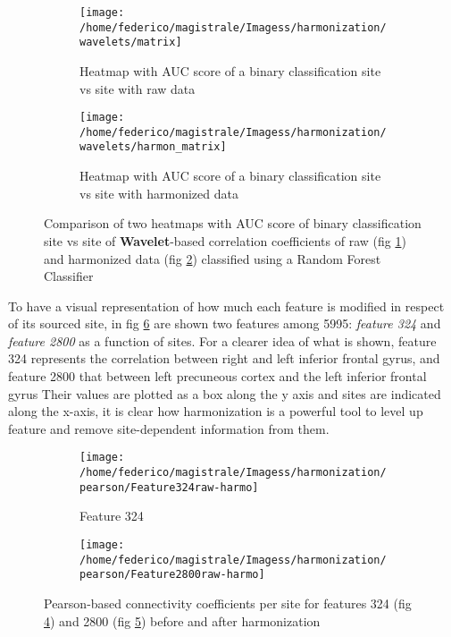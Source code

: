 \documentclass[10pt]{report}
\begin{document}
\begin{figure}
\centering
\begin{subfigure}[b]{0.70\textwidth}
   \texttt{[image: /home/federico/magistrale/Imagess/harmonization/wavelets/matrix]}
   \caption{Heatmap with AUC score of a binary classification site vs site with raw data}
   \label{fig:heatmap_harmonization_harmon_w}
\end{subfigure}

\begin{subfigure}[b]{0.70\textwidth}
   \texttt{[image: /home/federico/magistrale/Imagess/harmonization/wavelets/harmon\_matrix]}
   \caption{Heatmap with AUC score of a binary classification site vs site with harmonized data}
   \label{fig:heatmap_harmonization_noharmon_w}
\end{subfigure}

\caption{Comparison of two heatmaps with AUC score of binary classification site vs site of \textbf{Wavelet}-based correlation coefficients of raw (fig \ref{fig:heatmap_harmonization_harmon_w}) and harmonized data (fig \ref{fig:heatmap_harmonization_noharmon_w}) classified using a Random Forest Classifier
}
\label{fig:heatmap_harmonization_w}
\end{figure}





To have a visual representation of how much each feature is modified in respect of its sourced site, in fig \ref{fig:features_raw-harmo} are shown two features among 5995: \emph{feature 324} and \emph{feature 2800} as a function of sites.
For a clearer idea of what is shown, feature 324 represents the correlation between right and left inferior frontal gyrus, and feature 2800 that between left precuneous cortex and the left inferior frontal gyrus
Their values are plotted as a box along the y axis and sites are indicated along the x-axis, it is clear how harmonization is a powerful tool to level up feature and remove site-dependent information from them.

\begin{figure}
\centering
\begin{subfigure}[b]{1.\textwidth}
   \texttt{[image: /home/federico/magistrale/Imagess/harmonization/pearson/Feature324raw-harmo]}
   \caption{Feature 324 }
   \label{fig:feature324}
\end{subfigure}
\begin{subfigure}[b]{1.\textwidth}
   \texttt{[image: /home/federico/magistrale/Imagess/harmonization/pearson/Feature2800raw-harmo]}
   \caption{}
   \label{fig:feature2800}
\end{subfigure}
\caption{Pearson-based connectivity coefficients per site for features 324 (fig \ref{fig:feature324}) and 2800 (fig \ref{fig:feature2800}) before and after harmonization}
\label{fig:features_raw-harmo}
\end{figure}
\end{document}

